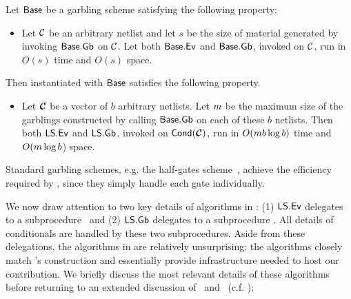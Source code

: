 \begin{theorem}\label{thm:efficiency}
  Let $\textsf{Base}$ be a garbling scheme satisfying the following
  property:
  \begin{itemize}
    \item Let $\mathcal C$ be an arbitrary netlist and let $s$ be the size of
      material generated by invoking $\textsf{Base}.\textsf{Gb}$ on $\mathcal C$.
      Let both $\textsf{Base}.\textsf{Ev}$ and $\textsf{Base}.\textsf{Gb}$, invoked
      on $\mathcal C$, run in $O(s)$ time and $O(s)$ space.
  \end{itemize}
  Then  instantiated with $\textsf{Base}$ satisfies the
  following property.
  \begin{itemize}
    \item Let $\vec{\cir}$ be a vector of $b$ arbitrary netlists. Let $m$ be
      the maximum size of the garblings constructed by calling
      $\textsf{Base}.\textsf{Gb}$ on each of these $b$ netlists.
      Then both $\textsf{LS}.\textsf{Ev}$ and $\textsf{LS}.\textsf{Gb}$, invoked on
      $\conditional(\vec{\cir})$, run in
      $O(m b \log b)$ time and $O(m \log b$) space.
  \end{itemize}
\end{theorem}

Standard garbling schemes, e.g. the
half-gates scheme~\cite{EC:ZahRosEva15}, achieve the efficiency
required by , since they simply handle each gate
individually.

We now draw attention to two key details of algorithms in
:
(1) $\textsf{LS}.\textsf{Ev}$ delegates to a subprocedure \evcond\ and (2)
$\textsf{LS}.\textsf{Gb}$ delegates to a subprocedure \gbcond.
%
All details of conditionals are handled by these two subprocedures.
%
Aside from these delegations, the algorithms in  are
relatively unsurprising:
the algorithms closely match \HK's construction and essentially
provide 
infrastructure needed to host our contribution.
%
We briefly discuss the most relevant details of these 
algorithms before returning
to an extended discussion of \evcond\ and \gbcond~(c.f. ):

